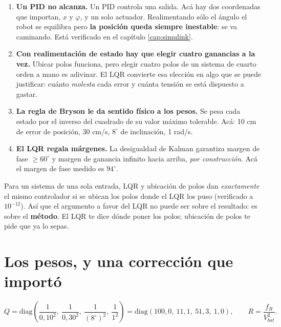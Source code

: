 \documentclass[11pt,a4paper]{report}
\begin{document}
\begin{enumerate}[leftmargin=1.6em]
\item \textbf{Un PID no alcanza.} Un PID controla una salida. Acá hay dos coordenadas que
      importan, $x$ y $\varphi$, y un solo actuador. Realimentando sólo el ángulo el robot
      se equilibra pero \textbf{la posición queda siempre inestable}: se va caminando. Está
      verificado en el capítulo \ref{cap:simulink}.
\item \textbf{Con realimentación de estado hay que elegir cuatro ganancias a la vez.} Ubicar
      polos funciona, pero elegir cuatro polos de un sistema de cuarto orden a mano es
      adivinar. El LQR convierte esa elección en algo que se puede justificar: cuánto
      \emph{molesta} cada error y cuánta tensión se está dispuesto a gastar.
\item \textbf{La regla de Bryson le da sentido físico a los pesos.} Se pesa cada estado por
      el inverso del cuadrado de su valor máximo tolerable. Acá: 10 cm de error de posición,
      30 cm/s, $8^\circ$ de inclinación, 1 rad/s.
\item \textbf{El LQR regala márgenes.} La desigualdad de Kalman garantiza margen de fase
      $\geq 60^\circ$ y margen de ganancia infinito hacia arriba, \emph{por construcción}.
      Acá el margen de fase medido es $94^\circ$.
\end{enumerate}

\begin{ojo}
Para un sistema de una sola entrada, LQR y ubicación de polos dan \emph{exactamente} el mismo
controlador si se ubican los polos donde el LQR los puso (verificado a $10^{-12}$). Así que el
argumento a favor del LQR no puede ser sobre el resultado: es sobre el \textbf{método}. El LQR
te dice dónde poner los polos; ubicación de polos te pide que ya lo sepas.
\end{ojo}

\section{Los pesos, y una corrección que importó}

\begin{equation}
Q = \mathrm{diag}\!\left(\frac{1}{0{,}10^2},\ \frac{1}{0{,}30^2},\
\frac{1}{(8^\circ)^2},\ \frac{1}{1^2}\right)
= \mathrm{diag}(100{,}0,\ 11{,}1,\ 51{,}3,\ 1{,}0),
\qquad
R = \frac{f_R}{V_{bat}^2}.
\end{equation}
\end{document}
